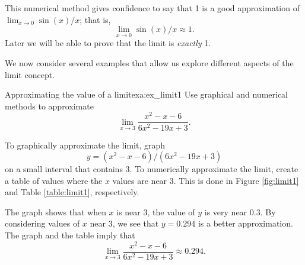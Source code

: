 This numerical method gives confidence to say that 1 is a good approximation of $\lim_{x\to 0} \sin(x)/x$; that is, $$\lim_{x\to 0} \sin(x)/x \approx 1.$$ Later we will be able to prove that the limit is \textit{exactly} 1.




We now consider several examples that allow us explore different aspects of the limit concept.\\

 
\begin{example}{Approximating the value of a limit}{exa:ex_limit1}{
Use graphical and numerical methods to approximate $$\lim_{x\to 3} \frac{x^2-x-6}{6x^2-19x+3}.$$}%
\end{example}


\begin{solution}
{To graphically approximate the limit, graph $$y = (x^2-x-6)/(6x^2-19x+3)$$ on a small interval that contains $ 3 $. To numerically approximate the limit, create a table of values where the $x$ values are near $ 3 $. This is done in Figure \ref{fig:limit1} and Table \ref{table:limit1}, respectively.



The graph shows that when $x$ is near 3, the value of $y$ is very near $0.3$. By considering values of $x$ near 3, we see that $y=0.294$ is a better approximation. The graph and the table imply that $$\lim_{x\to 3} \frac{x^2-x-6}{6x^2-19x+3} \approx 0.294.$$ 
}
\end{solution}
 




